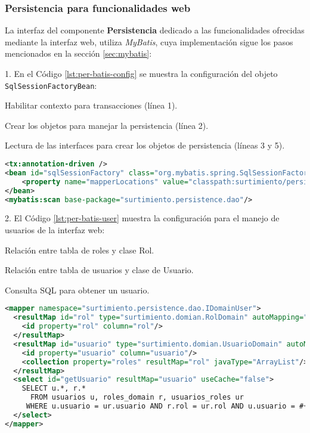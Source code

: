\subsubsection{Persistencia para funcionalidades web}\label{sec:persistence-web}
La interfaz del componente \textbf{Persistencia} dedicado a las funcionalidades ofrecidas mediante la interfaz web, utiliza \textit{MyBatis}, cuya implementación sigue los pasos mencionados en la sección \ref{sec:mybatis}:\\
\par 1. En el Código \ref{lst:per-batis-config} se muestra la configuración del objeto \texttt{SqlSessionFactoryBean}: 
\begin{enumerate}
	{\setlength\itemindent{25pt}\item Habilitar contexto para transacciones (línea 1).}
	{\setlength\itemindent{25pt}\item Crear los objetos para manejar la persistencia (línea 2).}
	{\setlength\itemindent{25pt}\item Lectura de las interfaces para crear los objetos de persistencia (líneas 3 y 5).}
\end{enumerate}
\begin{lstlisting}[language=XML, caption={Configuración de \textit{MyBatis} con \textit{Spring}.}, captionpos=b, label={lst:per-batis-config}]
<tx:annotation-driven />
<bean id="sqlSessionFactory" class="org.mybatis.spring.SqlSessionFactoryBean">
	<property name="mapperLocations" value="classpath:surtimiento/persistence/dao/*.xml" />
</bean>
<mybatis:scan base-package="surtimiento.persistence.dao"/>
\end{lstlisting}
\par 2. El Código \ref{lst:per-batis-user} muestra la configuración para el manejo de usuarios de la interfaz web:
\begin{enumerate}
	{\setlength\itemindent{25pt}\item Relación entre tabla de roles y clase Rol.}
	{\setlength\itemindent{25pt}\item Relación entre tabla de usuarios y clase de Usuario.}
	{\setlength\itemindent{25pt}\item Consulta SQL para obtener un usuario.}
\end{enumerate}
\begin{lstlisting}[language=XML, caption={Definición de relación de \textit{MyBatis}.}, captionpos=b, label={
lst:per-batis-user}]
<mapper namespace="surtimiento.persistence.dao.IDomainUser">
  <resultMap id="rol" type="surtimiento.domian.RolDomain" autoMapping="true">
    <id property="rol" column="rol"/>
  </resultMap>
  <resultMap id="usuario" type="surtimiento.domian.UsuarioDomain" autoMapping="true">
    <id property="usuario" column="usuario"/>
    <collection property="roles" resultMap="rol" javaType="ArrayList"/>
  </resultMap>
  <select id="getUsuario" resultMap="usuario" useCache="false">
    SELECT u.*, r.*
      FROM usuarios u, roles_domain r, usuarios_roles ur
     WHERE u.usuario = ur.usuario AND r.rol = ur.rol AND u.usuario = #{0};
  </select>
</mapper>
\end{lstlisting}
